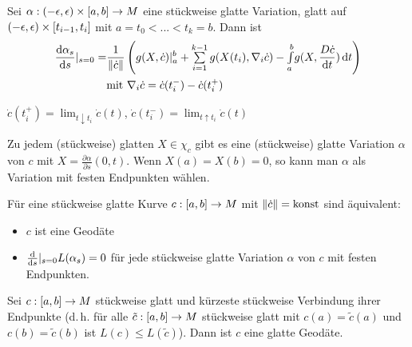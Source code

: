 \documentclass{cheat-sheet}
\newcommand{\vinterval}{\ointerval{-\epsilon}{\epsilon}} %
\begin{document}

\begin{satz}
  Sei $\alpha : \vinterval \times \cinterval{a}{b} \to M$ eine stückweise glatte Variation, glatt auf $\vinterval \times \cinterval{t_{i-1}}{t_i}$ mit $a = t_0 < ... < t_k = b$. Dann ist
  \begin{align*}
    \frac{\d \alpha_s}{\d s} |_{s=0} = & \frac{1}{\norm{\dot{c}}} \left( g(X, \dot{c})|_a^b + \sum_{i=1}^{k-1} g(X(t_i), \nabla_i \dot{c}) - \Int{a}{b}{g(X, \frac{D \dot{c}}{\d t})}{t} \right) \\
    & \text{mit } \nabla_i \dot{c} = \dot{c}(t_i^-) - \dot{c}(t_i^+)
  \end{align*}
\end{satz}

\begin{nota}
  $\dot{c}(t_i^+) = \lim_{t \downarrow t_i} \dot{c}(t)$, \enspace
  $\dot{c}(t_i^-) = \lim_{t \uparrow t_i} \dot{c}(t)$
\end{nota}

\begin{satz}
  Zu jedem (stückweise) glatten $X \in \chi_c$ gibt es eine (stückweise) glatte Variation $\alpha$ von $c$ mit $X = \tfrac{\partial \alpha}{\partial s} (0, t)$. Wenn $X(a) = X(b) = 0$, so kann man $\alpha$ als Variation mit festen Endpunkten wählen.
\end{satz}

\begin{satz}
  Für eine stückweise glatte Kurve $c : \left[ a, b \right] \to M$ mit $\lVert\dot{c}\rVert = \text{konst}$ sind äquivalent:
  \begin{itemize}
    \item $c$ ist eine Geodäte
    \item $\tfrac{\mathrm{d}}{\mathrm{d} s}|_{s=0} L(\alpha_s) = 0$ für jede stückweise glatte Variation $\alpha$ von $c$ mit festen Endpunkten.
  \end{itemize}
\end{satz}


\begin{kor}
  Sei $c : \left[ a, b \right] \to M$ stückweise glatt und kürzeste stückweise Verbindung ihrer Endpunkte (d.\,h. für alle $\tilde{c} : \left[ a, b \right] \to M$ stückweise glatt mit $c(a) = \tilde{c}(a)$ und $c(b) = \tilde{c}(b)$ ist $L(c) \leq L(\tilde{c})$). Dann ist $c$ eine glatte Geodäte.
\end{kor}
\end{document}
